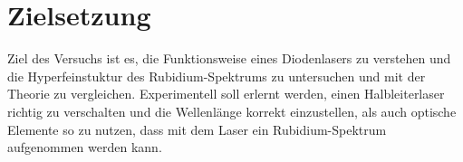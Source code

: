 \section{Zielsetzung}
Ziel des Versuchs ist es, die Funktionsweise eines Diodenlasers zu verstehen und die Hyperfeinstuktur des Rubidium-Spektrums zu untersuchen
und mit der Theorie zu vergleichen. Experimentell soll erlernt werden, einen Halbleiterlaser richtig zu verschalten und die Wellenlänge korrekt einzustellen, 
als auch optische Elemente so zu nutzen, dass mit dem Laser ein Rubidium-Spektrum aufgenommen werden kann.